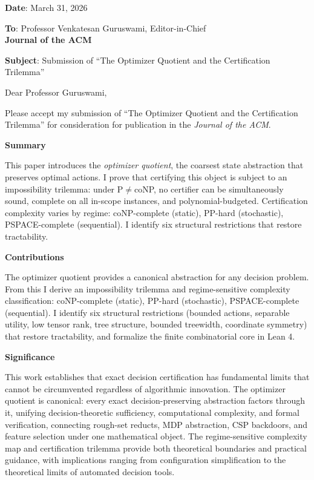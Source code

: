 \documentclass[10pt]{article}
\begin{document}

\noindent\textbf{Date}: March 31, 2026

\noindent\textbf{To}: Professor Venkatesan Guruswami, Editor-in-Chief \\
\textbf{Journal of the ACM}

\noindent\textbf{Subject}: Submission of ``The Optimizer Quotient and the Certification Trilemma''

\noindent Dear Professor Guruswami,

Please accept my submission of ``The Optimizer Quotient and the Certification Trilemma'' for consideration for publication in the \textit{Journal of the ACM}.

\noindent\textbf{Summary}

This paper introduces the \emph{optimizer quotient}, the coarsest state abstraction that preserves optimal actions. I prove that certifying this object is subject to an impossibility trilemma: under P$\neq$coNP, no certifier can be simultaneously sound, complete on all in-scope instances, and polynomial-budgeted. Certification complexity varies by regime: coNP-complete (static), PP-hard (stochastic), PSPACE-complete (sequential). I identify six structural restrictions that restore tractability.

\noindent\textbf{Contributions}

The optimizer quotient provides a canonical abstraction for any decision problem. From this I derive an impossibility trilemma and regime-sensitive complexity classification: coNP-complete (static), PP-hard (stochastic), PSPACE-complete (sequential). I identify six structural restrictions (bounded actions, separable utility, low tensor rank, tree structure, bounded treewidth, coordinate symmetry) that restore tractability, and formalize the finite combinatorial core in Lean 4.

\noindent\textbf{Significance}

This work establishes that exact decision certification has fundamental limits that cannot be circumvented regardless of algorithmic innovation. The optimizer quotient is canonical: every exact decision-preserving abstraction factors through it, unifying decision-theoretic sufficiency, computational complexity, and formal verification, connecting rough-set reducts, MDP abstraction, CSP backdoors, and feature selection under one mathematical object. The regime-sensitive complexity map and certification trilemma provide both theoretical boundaries and practical guidance, with implications ranging from configuration simplification to the theoretical limits of automated decision tools.
\end{document}
